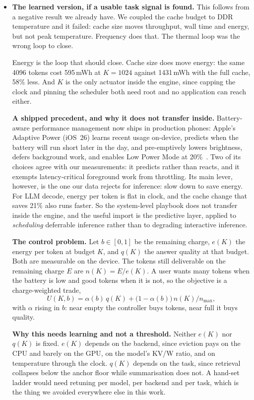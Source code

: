 \documentclass[11pt]{article}
\begin{document}
\begin{itemize}
\item \textbf{The learned version, if a usable task signal is found.} This follows from a
negative result we already have. We coupled the cache budget to DDR temperature and it failed:
cache size moves throughput, wall time and energy, but not peak temperature. Frequency does
that. The thermal loop was the wrong loop to close.

Energy is the loop that should close. Cache size does move energy: the same 4096 tokens cost
595\,mWh at $K{=}1024$ against 1431\,mWh with the full cache, 58\% less. And $K$ is the only
actuator inside the engine, since capping the clock and pinning the scheduler both need root
and no application can reach either.

\textbf{A shipped precedent, and why it does not transfer inside.} Battery-aware performance
management now ships in production phones: Apple's Adaptive Power (iOS~26) learns recent usage
on-device, predicts when the battery will run short later in the day, and pre-emptively lowers
brightness, defers background work, and enables Low Power Mode at 20\%~\cite{adaptivepower}.
Two of its choices agree with our measurements: it predicts rather than reacts, and it exempts
latency-critical foreground work from throttling. Its main lever, however, is the one our data
rejects for inference: slow down to save energy. For LLM decode, energy per token is flat in
clock, and the cache change that saves 21\% also runs faster. So the system-level playbook does
not transfer inside the engine, and the useful import is the predictive layer, applied to
\emph{scheduling} deferrable inference rather than to degrading interactive inference.

\textbf{The control problem.} Let $b\in[0,1]$ be the remaining charge, $e(K)$ the energy per
token at budget $K$, and $q(K)$ the answer quality at that budget. Both are measurable on the
device. The tokens still deliverable on the remaining charge $E$ are $n(K)=E/e(K)$. A user
wants many tokens when the battery is low and good tokens when it is not, so the objective is
a charge-weighted trade,
\[
  U(K,b)=\alpha(b)\,q(K)+\bigl(1-\alpha(b)\bigr)\,n(K)/n_{\max},
\]
with $\alpha$ rising in $b$: near empty the controller buys tokens, near full it buys quality.

\textbf{Why this needs learning and not a threshold.} Neither $e(K)$ nor $q(K)$ is fixed.
$e(K)$ depends on the backend, since eviction pays on the CPU and barely on the GPU, on the
model's KV/W ratio, and on temperature through the clock. $q(K)$ depends on the task, since
retrieval collapses below the anchor floor while summarisation does not. A hand-set ladder
would need retuning per model, per backend and per task, which is the thing we avoided
everywhere else in this work.


\end{itemize}
\end{document}
